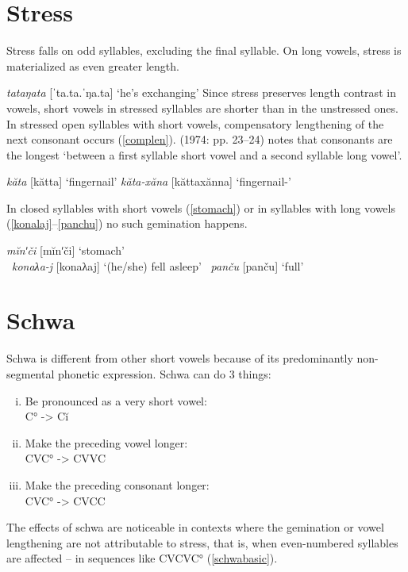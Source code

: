 \documentclass[a4paper, 12pt]{article}
\begin{document}
		\section{Stress}
	
	Stress falls on odd syllables, excluding the final syllable. On long vowels, stress is materialized as even greater length.

	\ex\label{}\emph{tataŋata} [ˈta.ta.ˈŋa.ta] \hfill `he’s exchanging' \xe
	Since stress preserves length contrast in vowels, short vowels in stressed syllables are shorter than in the unstressed ones. In stressed open syllables with short vowels, compensatory lengthening of the next consonant occurs (\ref{complen}). \citeauthor{sammallahti1974} (1974: pp. 23--24) notes that consonants are the longest `between a first syllable short vowel and a second syllable long vowel'.

	\pex\label{complen}\a \emph{kăta} [kătta] \hfill `fingernail'
		\a \emph{kăta-xăna} [kăttaxănna] \hfill `fingernail-{\Ins}'
	\xe
	
	In closed syllables with short vowels (\ref{stomach}) or in syllables with long vowels (\ref{konalaj}--\ref{panchu}) no such gemination happens.
	
	\ex\label{stomach}\emph{mĭnʹči} [mĭnʹči] \hfill `stomach' 	\\\hfill \parencite[p. 22]{sammallahti1974}\xe
	\ex~\label{konalaj}\emph{konaλa-j} [konaλaj] \hfill `(he/she) fell asleep' \xe
	\ex~\label{panchu}\emph{panču} [panču] \hfill `full' \\\hfill \parencite[p. 22]{sammallahti1974}\xe
	
		\section{Schwa}
	
	Schwa is different from other short vowels because of its predominantly non-segmental phonetic expression. Schwa can do 3 things:
	
	\begin{enumerate}[i.]
		\item Be pronounced as a very short vowel:\\ 
			C° -> Cĭ
		\item Make the preceding vowel longer:\\
			CVC° -> CVVC
		\item Make the preceding consonant longer:\\ 
			CVC° -> CVCC
	\end{enumerate}
	The effects of schwa are noticeable in contexts where the gemination or vowel lengthening are not attributable to stress, that is, when even-numbered syllables are affected -- in sequences like CVCVC° (\ref{schwabasic}).
	
\end{document}
